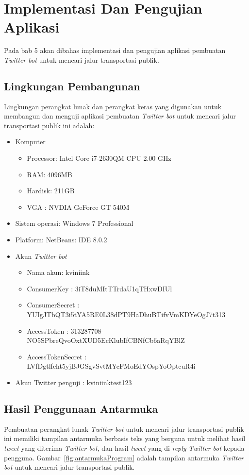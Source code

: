 \chapter{Implementasi Dan Pengujian Aplikasi}
\label{chap:implementasi dan pengujian aplikasi}

Pada bab 5 akan dibahas implementasi dan pengujian aplikasi pembuatan \textit{Twitter bot} untuk mencari jalur transportasi publik.

\section{Lingkungan Pembangunan}
Lingkungan perangkat lunak dan perangkat keras yang digunakan untuk membangun dan menguji aplikasi pembuatan \textit{Twitter bot} untuk mencari jalur transportasi publik ini adalah:
\begin{itemize}
	\item Komputer
	
	
	\begin{itemize}
		\item Processor: Intel Core i7-2630QM CPU 2.00 GHz
		\item RAM: 4096MB
		\item Hardisk: 211GB
		\item VGA : NVDIA GeForce GT 540M
	\end{itemize}
	\item Sistem operasi: Windows 7 Professional
	\item Platform: NetBeans: IDE 8.0.2
	
	\item Akun \textit{Twitter bot}
	\begin{itemize}
		\item Nama akun: kviniink
		\item ConsumerKey : 3iT8duMItTTrdaU1qTHxwDIUl
		\item ConsumerSecret : YUIgJTbQT3i5tYA5RE0L38dPT9HaDhuBTifvVmKDYeOgJ7t313
		\item AccessToken : 313287708-NO5SPbreQvoOxtXUD5EcKlubIfCBNfCb6aRqYBlZ
		\item AccessTokenSecret : LVfDgtlfeht5yjBJGSgvSvtMYcFMoEdYOspYoOptcuR4i
	\end{itemize}
	
	\item Akun Twitter penguji : kviniinktest123
\end{itemize}


\section{Hasil Penggunaan Antarmuka}
Pembuatan perangkat lunak \textit{Twitter bot} untuk mencari jalur transportasi publik ini memiliki tampilan antarmuka berbasis teks yang berguna untuk melihat hasil \textit{tweet} yang diterima \textit{Twitter bot}, dan hasil \textit{tweet} yang di-\textit{reply} \textit{Twitter bot} kepada pengguna. Gambar~\ref{fig:antarmukaProgram} adalah tampilan antarmuka \textit{Twitter bot} untuk mencari jalur transportasi publik.

